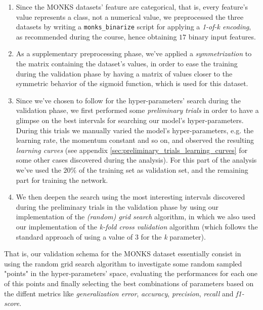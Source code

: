 \documentclass[11pt,twoside]{article}
\begin{document}
    \begin{enumerate}
        \item Since the MONKS datasets' feature are categorical, that is, every feature's value represents a
        class, not a numerical value, we preprocessed the three datasets by writing a \texttt{monks\_binarize}
        script for applying a \textit{1-of-k encoding}, as recommended during the course, hence obtaining
        $17$ binary input features.
        \item As a supplementary preprocessing phase, we've applied a \textit{symmetrization} to the matrix
        containing the dataset's values, in order to ease the training during the validation phase by having
        a matrix of values closer to the symmetric behavior of the sigmoid function, which is used for this
        dataset.
        \item Since we've chosen to follow \cite{random_search} for the hyper-parameters' search during the
        validation phase, we first performed some \textit{preliminary trials} in order to have a glimpse on
        the best intervals for searching our model's hyper-parameters. During this trials we manually varied
        the model's hyper-parameters, e.g. the learning rate, the momentum constant and so on, and observed
        the resulting \textit{learning curves} (see appendix \ref{sec:preliminary_trials_learning_curves} for
        some other cases discovered during the analysis). For this part of the analysis we've used the
        $20\%$ of the training set as validation set, and the remaining part for training the network.
        \item We then deepen the search using the most interesting intervals discovered during the
        preliminary trials in the validation phase by using our implementation of the \textit{(random) grid
        search} algorithm, in which we also used our implementation of the \textit{k-fold cross validation}
        algorithm (which follows the standard approach of using a value of $3$ for the \textit{k} parameter).
    \end{enumerate}

    That is, our validation schema for the MONKS dataset essentially consist in using the random grid search
    algorithm to investigate some random sampled "points" in the hyper-parameters' space, evaluating the
    performances for each one of this points and finally selecting the best combinations of parameters based
    on the diffent metrics like \textit{generalization error}, \textit{accuracy}, \textit{precision},
    \textit{recall} and \textit{f1-score}.
\end{document}
